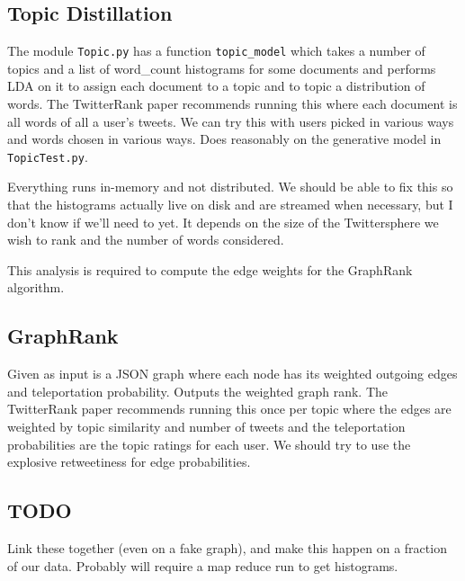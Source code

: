 

\subsection*{Topic Distillation}

The module \texttt{Topic.py} has a function \texttt{topic\_model} which takes a number of topics and a list of word_count histograms for some documents and performs LDA on it to assign each document to a topic and to topic a distribution of words.
The TwitterRank paper recommends running this where each document is all words of all a user's tweets.  
We can try this with users picked in various ways and words chosen in various ways.  
Does reasonably on the generative model in \texttt{TopicTest.py}.

Everything runs in-memory and not distributed.
We should be able to fix this so that the histograms actually live on disk and are streamed when necessary, but I don't know if we'll need to yet.  It depends on the size of the Twittersphere we wish to rank and the number of words considered.  

This analysis is required to compute the edge weights for the GraphRank algorithm.  


\subsection*{GraphRank}

Given as input is a JSON graph where each node has its weighted outgoing edges and teleportation probability.
Outputs the weighted graph rank.  
The TwitterRank paper recommends running this once per topic where the edges are weighted by topic similarity and number of tweets and the teleportation probabilities are the topic ratings for each user.  
We should try to use the explosive retweetiness for edge probabilities.  

\subsection*{TODO}

Link these together (even on a fake graph), and make this happen on a fraction of our data.
Probably will require a map reduce run to get histograms.  
